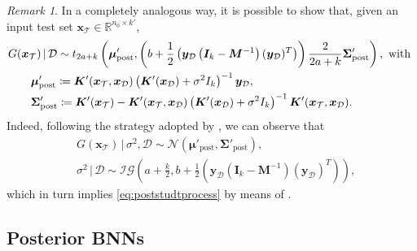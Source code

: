 \documentclass[a4paper, 11pt, reqno]{amsart}
\newcommand{\citet}[2][]{\citeauthor{#2} \cite[#1]{#2}}
\theoremstyle{plain}
\theoremstyle{remark}
\newtheorem{remark}[theorem]{Remark}
\theoremstyle{definition}
\newcommand{\given}{\, | \,}
\newcommand{\normal}[2]{\mathcal{N}\left(#1, #2\right)}
\newcommand{\invgamma}[2]{\mathcal{IG}\left(#1, #2\right)}
\newcommand{\tstud}[3]{t_{#1}\left(#2, #3\right)}
\newcommand{\real}{\mathbb{R}}
\newcommand{\train}{\mathcal{D}}
\begin{document}
\begin{remark} \label{rem:poststudtprocess}
    In a completely analogous way, it is possible to show that, given an input test set $\bm{x}_{\mathcal{T}} \in \real^{n_0 \times k'}$, 
    \begin{equation} \label{eq:poststudtprocess}
        \begin{aligned}
            & G(\bm{x}_{\mathcal{T}}) \given \train \sim \tstud{2a + k}{\bm{\mu}'_{\mathrm{post}}}{\left(b + \frac{1}{2} \left(\bm{y}_{\mathcal{D}} \left(\bm{I}_{k} - \bm{M}^{-1}\right) (\bm{y}_{\mathcal{D}})^T\right)\right) \frac{2}{2a + k} \bm{\Sigma}'_{\mathrm{post}}}, \text{ with } \\
            & \kern20pt \bm{\mu}'_{\mathrm{post}} \coloneqq \bm{K}'(\bm{x}_{\mathcal{T}}, \bm{x}_{\mathcal{D}}) \left(\bm{K}'(\bm{x}_{\mathcal{D}}) + \sigma^2 I_{k}\right)^{-1} \bm{y}_{\mathcal{D}}, \\
            & \kern20pt \bm{\Sigma}'_{\mathrm{post}} \coloneqq \bm{K}'(\bm{x}_{\mathcal{T}}) - \bm{K}'(\bm{x}_{\mathcal{T}}, \bm{x}_{\mathcal{D}}) \left(\bm{K}'(\bm{x}_{\mathcal{D}}) + \sigma^2 I_{k}\right)^{-1} \bm{K}'(\bm{x}_{\mathcal{T}}, \bm{x}_{\mathcal{D}}). \\
        \end{aligned}
    \end{equation}
    Indeed, following the strategy adopted by \citet[eqs. (2.22) to (2.24)]{gp2006}, we can observe that
    \begin{align*}
        & G(\bm{x}_{\mathcal{T}}) \given \sigma^2, \train \sim \normal{\bm{\mu}'_{\mathrm{post}}}{\bm{\Sigma}'_{\mathrm{post}}}, \\
        & \sigma^2 \given \train \sim \invgamma{a + \frac{k}{2}}{b + \frac{1}{2} \left(\bm{y}_{\mathcal{D}} \left(\bm{I}_{k} - \bm{M}^{-1}\right) (\bm{y}_{\mathcal{D}})^T\right)},
    \end{align*}
    which in turn implies \cref{eq:poststudtprocess} by means of .
\end{remark}

\subsection{Posterior BNNs} \label{subsec:postbnn}
\end{document}
